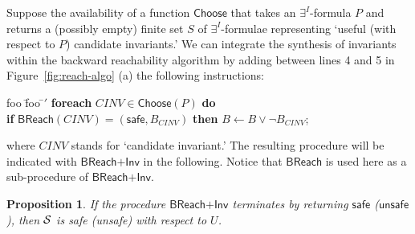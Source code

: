 \documentclass{LMCS}
\newcommand{\cSi}{\ensuremath \mathcal S}
\theoremstyle{plain}\newtheorem{assumption}[thm]{Assumption}
\theoremstyle{plain}\newtheorem{proposition}[thm]{Proposition}
\theoremstyle{plain}\newtheorem{property}[thm]{Property}
\theoremstyle{plain}\newtheorem{example}[thm]{Example}
\theoremstyle{plain}\newtheorem{claim}[thm]{Claim}
\theoremstyle{plain}\newtheorem{lemma}[thm]{Lemma}
\begin{document}
Suppose the availability of a function $\mathsf{Choose}$ that takes an
$\exists^I$-formula $P$ and returns a (possibly empty) finite set $S$
of $\exists^I$-formulae representing `useful (with respect to $P$)
candidate invariants.'  We can integrate the synthesis of invariants
within the backward reachability algorithm by adding between lines 4
and 5 in Figure~\ref{fig:reach-algo} (a) the following instructions:
\begin{center}
\begin{minipage}{.7\textwidth}
\begin{tabbing}
  foo \= foo \= $'$\> \> \textbf{foreach} $\mathit{CINV} \in \mathsf{Choose}(P)$
            \textbf{do} \\
  \> \> \hspace{.25cm} \textbf{if} $\mathsf{BReach}(\mathit{CINV})=
                                     (\mathsf{safe},B_{\mathit{CINV}})$
           \textbf{then} $B\longleftarrow B\vee \neg B_{\mathit{CINV}}$;
\end{tabbing}
\end{minipage}
\end{center}
where $\mathit{CINV}$ stands for `candidate invariant.'  The resulting
procedure will be indicated with $\mathsf{BReach\mbox{+}Inv}$ in the
following.  Notice that $\mathsf{BReach}$ is used here as a
sub-procedure of $\mathsf{BReach\mbox{+}Inv}$.
\begin{proposition}
  \label{prop:soundness}
If the procedure
  $\mathsf{BReach\mbox{+}Inv}$ terminates by returning $\mathsf{safe}$
  ($\mathsf{unsafe}$), then $\cSi$ is safe (unsafe) with respect to
  $U$.
\end{proposition}
\end{document}
